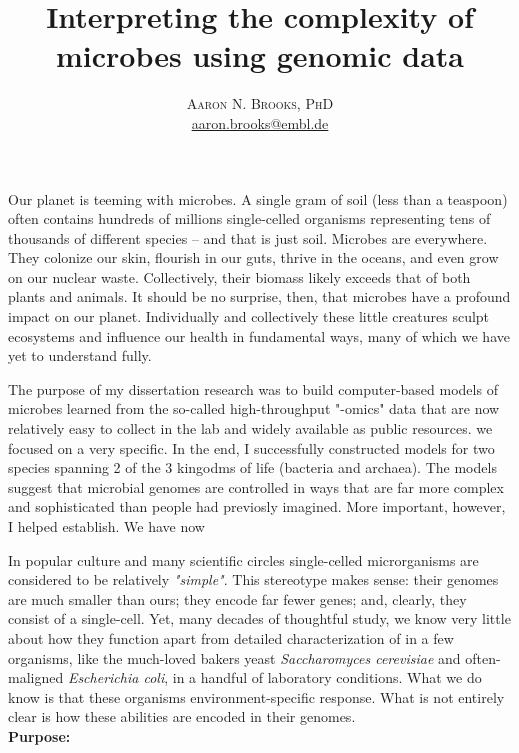 \documentclass[paper=letter, fontsize=12pt]{article}
\title{\vspace{-15mm}\fontsize{20pt}{10pt}\selectfont\textbf{Interpreting the complexity of microbes using genomic data}} %
\author{
\large
{\textsc{ Aaron N. Brooks, PhD }}\\[0.1mm]
\normalsize \href{mailto:aaron.brooks@embl.de}{aaron.brooks@embl.de}\\[0.1mm] %
}
\date{}
\begin{document}
\maketitle %
\thispagestyle{fancy} %

Our planet is teeming with microbes. A single gram of soil (less than a teaspoon) often contains hundreds of millions single-celled organisms representing tens of thousands of different species -- and that is just soil. Microbes are everywhere. They colonize our skin, flourish in our guts, thrive in the oceans, and even grow on our nuclear waste. Collectively, their biomass likely exceeds that of both plants and animals. It should be no surprise, then, that microbes have a profound impact on our planet. Individually and collectively these little creatures sculpt ecosystems and influence our health in fundamental ways, many of which we have yet to understand fully. 

The purpose of my dissertation research was to build computer-based models of microbes learned from the so-called high-throughput "-omics" data that are now relatively easy to collect in the lab and widely available as public resources.  we focused on a very specific. In the end, I successfully constructed models for two species spanning 2 of the 3 kingodms of life (bacteria and archaea).  The models suggest that microbial genomes are controlled in ways that are far more complex and sophisticated than people had previosly imagined. More important, however, I helped establish. We have now 

In popular culture and many scientific circles single-celled microrganisms are considered to be relatively 
\textit{"simple"}. This stereotype makes sense: their genomes are much smaller than ours; they encode far fewer genes; and, clearly, they consist of a single-cell.  Yet, many decades of thoughtful study, we know very little about how they function apart from detailed characterization of in a few organisms, like the much-loved bakers yeast \textit{Saccharomyces cerevisiae} and often-maligned \textit{Escherichia coli}, in a handful of laboratory conditions. What we do know is that these organisms environment-specific response. What is not
entirely clear is how these abilities are encoded in their genomes.\\[1mm]

\noindent\textbf{Purpose:}


\end{document}
